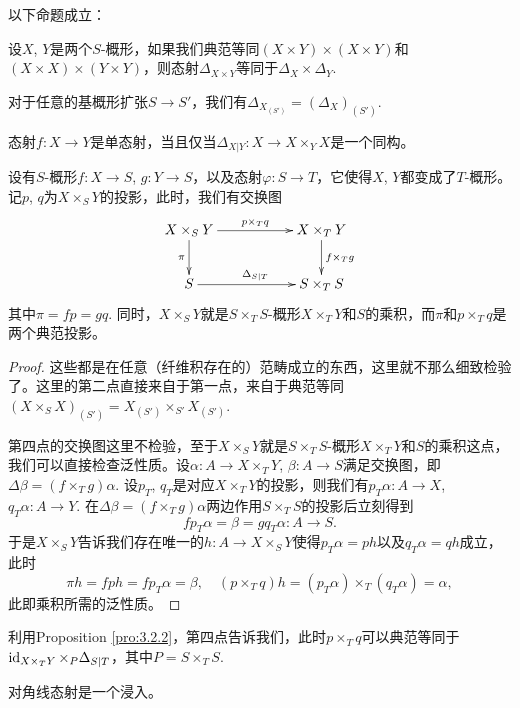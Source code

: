 \begin{pro}\label{pro:4.1.3}
以下命题成立：
\begin{compactenum}
\item 设$X$, $Y$是两个$S$-概形，如果我们典范等同$(X\times Y)\times (X\times Y)$和$(X\times X)\times (Y\times Y)$，则态射$\Delta_{X\times Y}$等同于$\Delta_X\times \Delta_Y$.	
\item 对于任意的基概形扩张$S\to S'$，我们有$\Delta_{X_{(S')}}=(\Delta_{X})_{(S')}$.
\item 态射$f:X\to Y$是单态射，当且仅当$\Delta_{X|Y}:X\to X\times_Y X$是一个同构。
\item 设有$S$-概形$f:X\to S$, $g:Y\to S$，以及态射$\varphi:S\to T$，它使得$X$, $Y$都变成了$T$-概形。记$p$, $q$为$X\times_S Y$的投影，此时，我们有交换图
\[
	\begin{xy}
	\xymatrix{
	X\times_S Y\ar[rr]^{p\times_T q}\ar[d]_{\pi}&&X\times_T Y\ar[d]^{f\times_T g}\\
	S\ar[rr]^{\Delta_{S|T}}&&S\times_TS
	}
	\end{xy}
\]
其中$\pi=fp=gq$. 同时，$X\times_S Y$就是$S\times_T S$-概形$X\times_T Y$和$S$的乘积，而$\pi$和$p\times_T q$是两个典范投影。
\end{compactenum}	
\end{pro}

\begin{proof}
这些都是在任意（纤维积存在的）范畴成立的东西，这里就不那么细致检验了。这里的第二点直接来自于第一点，来自于典范等同$(X\times_S X)_{(S')}=X_{(S')}\times_{S'}X_{(S')}$.

第四点的交换图这里不检验，至于$X\times_S Y$就是$S\times_T S$-概形$X\times_T Y$和$S$的乘积这点，我们可以直接检查泛性质。设$\alpha:A\to X \times_T Y$, $\beta:A\to S$满足交换图，即$\Delta\beta=(f\times_T g)\alpha$. 设$p_T$, $q_T$是对应$X\times_T Y$的投影，则我们有$p_T\alpha:A\to X$, $q_T\alpha:A\to Y$. 在$\Delta\beta=(f\times_T g)\alpha$两边作用$S\times_T S$的投影后立刻得到
\[
	fp_T\alpha=\beta=gq_T\alpha:A\to S.
\]
于是$X\times_S Y$告诉我们存在唯一的$h:A\to X\times_S Y$使得$p_T\alpha=ph$以及$q_T\alpha=qh$成立，此时
\[
	\pi h=fph=fp_T\alpha=\beta, \quad (p\times_T q)h=(p_T\alpha)\times_T (q_T\alpha)=\alpha,
\]
此即乘积所需的泛性质。
\end{proof}

利用Proposition \ref{pro:3.2.2}，第四点告诉我们，此时$p\times_T q$可以典范等同于$\operatorname{id}_{X\times_T Y}\times_{P}\Delta_{S|T}$，其中$P=S\times_T S$. 

\begin{lem}\label{lem:4.1.4}
	对角线态射是一个浸入。
\end{lem}

